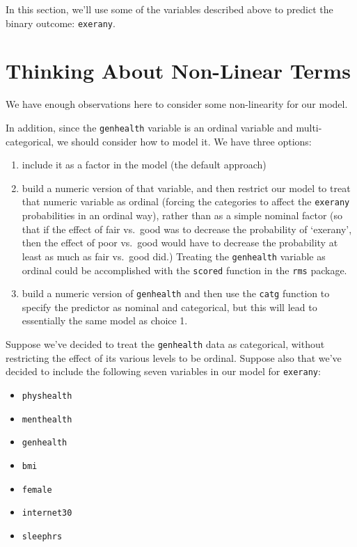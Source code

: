 \documentclass[]{book}
\providecommand{\tightlist}{%
  \setlength{\itemsep}{0pt}\setlength{\parskip}{0pt}}
\theoremstyle{definition}
\theoremstyle{definition}
\theoremstyle{definition}
\theoremstyle{remark}
\begin{document}
In this section, we'll use some of the variables described above to
predict the binary outcome: \texttt{exerany}.

\section{Thinking About Non-Linear
Terms}\label{thinking-about-non-linear-terms}

We have enough observations here to consider some non-linearity for our
model.

In addition, since the \texttt{genhealth} variable is an ordinal
variable and multi-categorical, we should consider how to model it. We
have three options:

\begin{enumerate}
\def\labelenumi{\arabic{enumi}.}
\tightlist
\item
  include it as a factor in the model (the default approach)
\item
  build a numeric version of that variable, and then restrict our model
  to treat that numeric variable as ordinal (forcing the categories to
  affect the \texttt{exerany} probabilities in an ordinal way), rather
  than as a simple nominal factor (so that if the effect of fair
  vs.~good was to decrease the probability of `exerany', then the effect
  of poor vs.~good would have to decrease the probability at least as
  much as fair vs.~good did.) Treating the \texttt{genhealth} variable
  as ordinal could be accomplished with the \texttt{scored} function in
  the \texttt{rms} package.
\item
  build a numeric version of \texttt{genhealth} and then use the
  \texttt{catg} function to specify the predictor as nominal and
  categorical, but this will lead to essentially the same model as
  choice 1.
\end{enumerate}

Suppose we've decided to treat the \texttt{genhealth} data as
categorical, without restricting the effect of its various levels to be
ordinal. Suppose also that we've decided to include the following seven
variables in our model for \texttt{exerany}:

\begin{itemize}
\tightlist
\item
  \texttt{physhealth}
\item
  \texttt{menthealth}
\item
  \texttt{genhealth}
\item
  \texttt{bmi}
\item
  \texttt{female}
\item
  \texttt{internet30}
\item
  \texttt{sleephrs}
\end{itemize}
\end{document}
